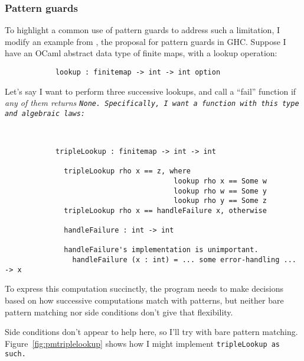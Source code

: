 \documentclass[manuscript,screen,review, 12pt, nonacm]{acmart}
\begin{document}
    \subsubsection{Pattern guards}
    \label{guards}

    To highlight a common use of pattern guards to address such a limitation, I
    modify an example from \citet{guardproposal}, the proposal for pattern
    guards in GHC. Suppose I have an OCaml abstract data type of finite maps,
    with a lookup operation: 

    \begin{minipage}[t]{\textwidth}
        \centering 
        \begin{verbatim}
            lookup : finitemap -> int -> int option
        \end{verbatim}
    \end{minipage}
    Let's say I want to perform three successive lookups, and call a “fail”
    function if \it{any} of them returns \tt{None}. Specifically, I want a
    function with this type and algebraic laws: 

    \begin{minipage}[t]{\textwidth}
        \centering 
        \begin{verbatim}
          

            tripleLookup : finitemap -> int -> int

              tripleLookup rho x == z, where 
                                        lookup rho x == Some w
                                        lookup rho w == Some y
                                        lookup rho y == Some z
              tripleLookup rho x == handleFailure x, otherwise
            
              handleFailure : int -> int 

              handleFailure's implementation is unimportant.
                handleFailure (x : int) = ... some error-handling ... -> x  

        \end{verbatim}
    \end{minipage}

    To express this computation succinctly, the program needs to make decisions
    based on how successive computations match with patterns, but neither bare
    pattern matching nor side conditions don't give that flexibility. 
    
    Side conditions don't appear to help here, so I'll try with bare pattern
    matching. Figure~\ref{fig:pmtriplelookup} shows how I might implement
    \tt{tripleLookup} as such. 
\end{document}
